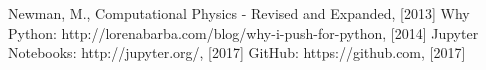 \documentclass[%
 reprint,
 amsmath,amssymb,
 aps,
]{revtex4-1}
\begin{document}












\begin{thebibliography}{}
 Newman, M., Computational Physics - Revised and Expanded, [2013] 
 Why Python: http://lorenabarba.com/blog/why-i-push-for-python, [2014]
 Jupyter Notebooks: http://jupyter.org/, [2017]
 GitHub: https://github.com, [2017]
\end{thebibliography}
\end{document}
